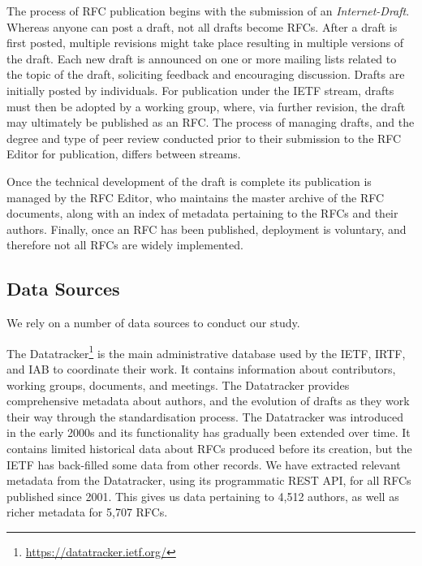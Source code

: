 \documentclass[twocolumn,10pt]{article}
\newcommand{\pb}[1]{\vspace{0.75ex}\noindent{\textbf{#1}}}
\begin{document}
The process of RFC publication begins with the submission of an
\emph{Internet-Draft}. Whereas anyone can post a draft, not all drafts
become RFCs. After a draft is first posted, multiple revisions might take
place resulting in multiple versions of the draft. Each new draft is
announced on one or more mailing lists related to the topic of the draft,
soliciting feedback and encouraging discussion. Drafts are initially posted
by individuals. For publication under the IETF stream, drafts must then be
adopted by a working group, where, via further revision, the draft may
ultimately be published as an RFC. The process of managing drafts, and the
degree and type of peer review conducted prior to their submission to the
RFC Editor for publication, differs between streams.

Once the technical development of the draft is complete its publication is
managed by the RFC Editor, who maintains the master archive of the RFC
documents, along with an index of metadata pertaining to the RFCs and their
authors. Finally, once an RFC has been published, deployment is voluntary,
and therefore not all RFCs are widely implemented.

\subsection{Data Sources}


We rely on a number of data sources to conduct our study.

\pb{IETF Datatracker:}
The Datatracker\footnote{\url{https://datatracker.ietf.org/}} is the main
administrative database used by the IETF, IRTF, and IAB to coordinate their
work. It contains information about contributors, working groups,
documents, and meetings. The Datatracker provides comprehensive metadata
about authors, and the evolution of drafts as they work their way through
the standardisation process. The Datatracker was introduced in the early
2000s and its functionality has gradually been extended over time. It
contains limited historical data about RFCs produced before its creation,
but the IETF has back-filled some data from other records.  We have
extracted relevant metadata from the Datatracker, using its programmatic
REST API, for all RFCs published since 2001. This gives us data pertaining
to 4,512 authors, as well as richer metadata for 5,707 RFCs.
\end{document}
